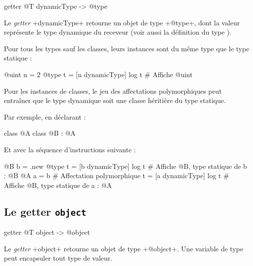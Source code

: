 \begin{galgas3}
getter @T dynamicType -> @type
\end{galgas3}

Le \emph{getter} \ggst+dynamicType+ retourne un objet de type \ggst+@type+, dont la valeur représente le type dynamique du receveur (voir aussi la définition du type ).

Pour tous les types sauf les classes, leurs instances sont du même type que le type statique :

\begin{galgas3}
@uint n = 2
@type t = [n dynamicType]
log t # Affiche @uint
\end{galgas3}

Pour les instances de classes, le jeu des affectations polymorphiques peut entraîner que le type dynamique soit une classe héritière du type statique.

Par exemple, en déclarant :
\begin{galgas3}
class @A { }
class @B : @A { }
\end{galgas3}

Et avec la séquence d'instructions suivante :
\begin{galgas3}
@B b = .new
@type t = [b dynamicType]
log t # Affiche @B, type statique de b : @B
@A a = b # Affectation polymorphique
t = [a dynamicType]
log t # Affiche @B, type statique de a : @A
\end{galgas3}





\subsection{Le getter \texttt{object}}

\begin{galgas3}
getter @T object -> @object
\end{galgas3}


Le \emph{getter} \ggst+object+ retourne un objet de type \ggst+@object+. Une variable de type  peut encapsuler tout type de valeur.

